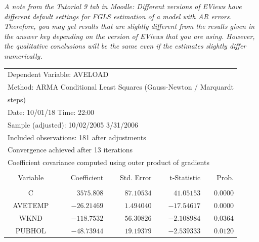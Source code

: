 \documentclass[12pt]{report}
\begin{document}
\vspace{-\baselineskip} \noindent \textit{A note from the Tutorial 9 tab in Moodle: Different versions of EViews have different default settings for FGLS estimation of a model with AR errors. Therefore, you may get results that are slightly different from the results given in the answer key depending on the version of EViews that you are using. However, the qualitative conclusions will be the same even if the estimates slightly differ numerically.}
\begin{table}[H]
	\centering
	\begin{tabular}{lrrrr}
		\multicolumn{3}{l}{Dependent Variable: AVELOAD}&\multicolumn{1}{c}{}&\multicolumn{1}{c}{}\\
		\multicolumn{5}{l}{Method: ARMA Conditional Least Squares (Gauss-Newton / Marquardt}\\
		\multicolumn{2}{l}{steps)}&\multicolumn{1}{c}{}&\multicolumn{1}{c}{}&\multicolumn{1}{c}{}\\
		\multicolumn{3}{l}{Date: 10/01/18   Time: 22:00}&\multicolumn{1}{c}{}&\multicolumn{1}{c}{}\\
		\multicolumn{4}{l}{Sample (adjusted): 10/02/2005 3/31/2006}&\multicolumn{1}{c}{}\\
		\multicolumn{5}{l}{Included observations: 181 after adjustments}\\
		\multicolumn{5}{l}{Convergence achieved after 13 iterations}\\
		\multicolumn{5}{l}{Coefficient covariance computed using outer product of gradients}\\
		[4.5pt] \hline \\ [-4.5pt]
		\multicolumn{1}{c}{Variable}&\multicolumn{1}{r}{Coefficient}&\multicolumn{1}{r}{Std. Error}&\multicolumn{1}{r}{t-Statistic}&\multicolumn{1}{r}{Prob.}\\
		[4.5pt] \hline \\ [-4.5pt]
		\multicolumn{1}{c}{C}&\multicolumn{1}{r}{$3575.808$}&\multicolumn{1}{r}{$87.10534$}&\multicolumn{1}{r}{$41.05153$}&\multicolumn{1}{r}{$0.0000$}\\
		\multicolumn{1}{c}{AVETEMP}&\multicolumn{1}{r}{$-26.21469$}&\multicolumn{1}{r}{$1.494040$}&\multicolumn{1}{r}{$-17.54617$}&\multicolumn{1}{r}{$0.0000$}\\
		\multicolumn{1}{c}{WKND}&\multicolumn{1}{r}{$-118.7532$}&\multicolumn{1}{r}{$56.30826$}&\multicolumn{1}{r}{$-2.108984$}&\multicolumn{1}{r}{$0.0364$}\\
		\multicolumn{1}{c}{PUBHOL}&\multicolumn{1}{r}{$-48.73944$}&\multicolumn{1}{r}{$19.19379$}&\multicolumn{1}{r}{$-2.539333$}&\multicolumn{1}{r}{$0.0120$}\\

\end{tabular}
\end{table}
\end{document}
